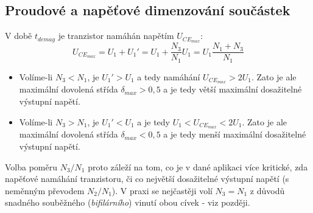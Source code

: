   \subsection{Proudové a napěťové dimenzování součástek}
    V době $t_{demag}$ je tranzistor namáhán napětím $U_{{CE}_{max}}$:
    \begin{equation}\label{ENZ:eq_dim_Ucemax}
      U_{{CE}_{max}} = U_1 + U_1' = U_1 + \frac{N_3}{N_1}U_1 = U_1\frac{N_1+N_3}{N_1}
    \end{equation}
    \begin{itemize}\addtolength{\itemsep}{-0.5\baselineskip}
     \item Volíme-li $N_3 < N_1$, je $U_1' > U_1$ a tedy namáhání $U_{{CE}_{max}} > 2U_1$. Zato
           je ale maximální dovolená střída $\delta_{max} > 0,5$ a je tedy větší maximální
           dosažitelné výstupní napětí.
     \item Volíme-li $N_3 > N_1$, je $U_1' < U_1$ a je tedy  $U_1 < U_{{CE}_{max}} < 2U_1$. Zato
           je ale maximální dovolená střída $\delta_{max} < 0,5$ a je tedy menší maximální
           dosažitelné výstupní napětí.
    \end{itemize}
    Volba  poměru  $N_3/N_1$ proto záleží na tom, co je v dané aplikaci více kritické, zda
    napěťové namáhání tranzistoru,  či co největší dosažitelné výstupní napětí (s neměnným
    převodem  $N_2/N_1$). V praxi se nejčastěji volí $N_3 = N_1$ z důvodů snadného souběžného
    (\emph{bifilárního}) vinutí obou cívek - viz později.
    
